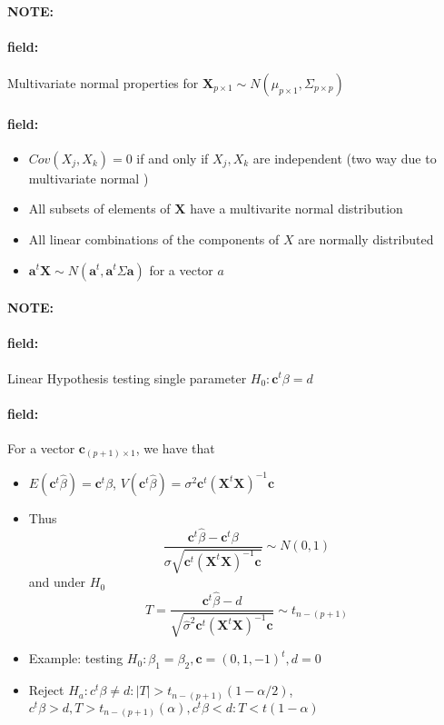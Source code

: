 \documentclass[12pt]{article}
\newenvironment{note}{\paragraph{NOTE:}}{}
\newenvironment{field}{\paragraph{field:}}{}
\begin{document}
\begin{note}
  \begin{field}
    Multivariate normal properties for $\mathbf{X}_{p \times 1} \sim N(\mu_{p\times 1}, \Sigma_{p \times p})$
  \end{field}
  \begin{field}
    \begin{itemize}
      \item $Cov(X_j,X_k) = 0$ if and only if $X_j,X_k$ are independent (two way due to multivariate normal )
      \item All subsets of elements of $\mathbf{X}$ have a multivarite normal distribution
      \item All linear combinations of the components of $X$ are normally distributed
      \item $\mathbf{a}^t \mathbf{X} \sim N(\mathbf{a}^t, \mathbf{a}^t \Sigma \mathbf{a})$ for a vector $a$
    \end{itemize}
  \end{field}
\end{note}


\begin{note}
  \begin{field}
    Linear Hypothesis testing single parameter $H_0: \mathbf{c}^t \beta = d$
  \end{field}
  \begin{field}
    For a vector $\mathbf{c}_{(p+1)\times 1}$, we have that
    \begin{itemize}
      \item $E(\textbf{c}^t\hat{\beta}) = \mathbf{c}^t \beta$, $V(\mathbf{c}^t \hat{\beta}) = \sigma^2 \mathbf{c}^t (\mathbf{X}^t \mathbf{X})^{-1} \mathbf{c}$
      \item Thus $$ \frac{\mathbf{c}^t \hat{\beta} - \mathbf{c}^t \beta }{\sigma \sqrt{\mathbf{c}^t(\mathbf{X}^t \mathbf{X})^{-1} \mathbf{c}}} \sim N(0,1)$$ and under $H_0$
      $$ T = \frac{\mathbf{c}^t \hat{\beta} - d}{ \sqrt{\hat{\sigma}^2\mathbf{c}^t(\mathbf{X}^t \mathbf{X})^{-1} \mathbf{c}}} \sim t_{n - (p+1)}$$
      \item Example: testing $H_0: \beta_1 = \beta_2, \mathbf{c} = (0,1,-1)^t, d = 0$
      \item Reject $H_a: c^t \beta \neq d:  |T| > t_{n - (p+1)}(1-\alpha/2)$, $c^t \beta > d, T > t_{n-(p+1)}(\alpha), c^t\beta < d: T < t(1 - \alpha)$
    \end{itemize}
  \end{field}
\end{note}
\end{document}
